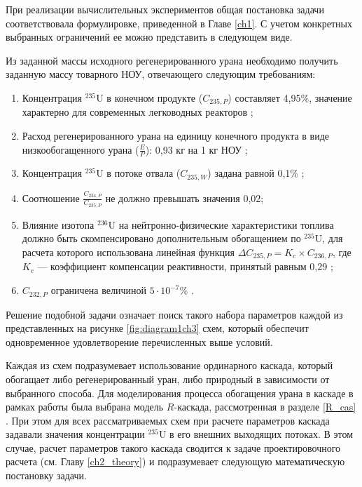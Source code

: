 При реализации вычислительных экспериментов общая постановка задачи соответствовала формулировке, приведенной в Главе \ref{ch1}. С учетом конкретных выбранных ограничений ее можно представить в следующем виде.

Из заданной массы исходного регенерированного урана необходимо получить заданную массу товарного НОУ, отвечающего следующим требованиям:

\begin{enumerate}
  \item Концентрация $^{235}$U в конечном продукте ($C_{235,P}$) составляет 4,95\%, значение характерно для современных легководных реакторов \cite{solovevaCennostiOYaTKak2019};
  \item Расход регенерированного урана на единицу конечного продукта в виде низкообогащенного урана ($\frac{E}{P}$): 0,93 кг на 1 кг НОУ \cite{smirnovApplyingEnrichmentCapacities2018};
  \item Концентрация $^{235}$U в потоке отвала ($C_{235,W}$) задана равной 0,1\% \cite{smirnovEvolutionIsotopicComposition2012};
  \item Соотношение $\frac{C_{234,P}}{C_{235,P}}$ не должно превышать значения 0,02;
  \item Влияние изотопа $^{236}$U на нейтронно-физические характеристики топлива должно быть скомпенсировано дополнительным обогащением по $^{235}$U, для расчета которого использована линейная функция $\Delta C_{235,P}=K_{c}\times C_{236,P}$, где $K_{c}$ --- коэффициент компенсации реактивности, принятый равным 0,29 \cite{smirnovApplyingEnrichmentCapacities2018};
  \item $C_{232,P}$ ограничена величиной $5\cdot10^{-7}$\% \cite{smirnovApplyingEnrichmentCapacities2018,smirnovAnalysisEffectRestrictions2021}.
\end{enumerate}

Решение подобной задачи означает поиск такого набора параметров каждой из представленных на рисунке \ref{fig:diagram1ch3} схем, который обеспечит одновременное удовлетворение перечисленных выше условий. 

Каждая из схем подразумевает использование ординарного каскада, который обогащает либо регенерированный уран, либо природный в зависимости от выбранного способа. Для моделирования процесса обогащения урана в каскаде в рамках работы была выбрана модель $R$-каскада, рассмотренная в разделе \ref{R_cas} \cite{sulaberidzeTeoriyaKaskadovDlya2011}. При этом для всех рассматриваемых схем при расчете параметров каскада задавали значения концентрации $^{235}$U в его внешних выходящих потоках. В этом случае, расчет параметров такого каскада сводится к задаче проектировочного расчета (см. Главу \ref{ch2_theory}) и подразумевает следующую математическую постановку задачи. 

